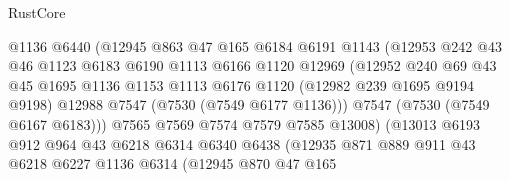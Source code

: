 \begin{lexlean}{RustCore}
\begin{coremodule}
                              @1136
                              @6440
                              (@12945
                                @863
                                @47
                                @165
                                @6184
                                @6191
                                @1143
                                (@12953
                                  @242
                                  @43
                                  @46
                                  @1123
                                  @6183
                                  @6190
                                  @1113
                                  @6166
                                  @1120
                                  @12969
                                  (@12952
                                    @240
                                    @69
                                    @43
                                    @45
                                    @1695
                                    @1136
                                    @1153
                                    @1113
                                    @6176
                                    @1120
                                    (@12982 @239 @1695 @9194 @9198)
                                    @12988
                                    @7547
                                    (@7530 (@7549 @6177 @1136)))
                                  @7547
                                  (@7530 (@7549 @6167 @6183)))
                                @7565
                                @7569
                                @7574
                                @7579
                                @7585
                                @13008)
                              (@13013
                                @6193
                                @912
                                @964
                                @43
                                @6218
                                @6314
                                @6340
                                @6438
                                (@12935
                                  @871
                                  @889
                                  @911
                                  @43
                                  @6218
                                  @6227
                                  @1136
                                  @6314
                                  (@12945
                                    @870
                                    @47
                                    @165

\end{coremodule}
\end{lexlean}
